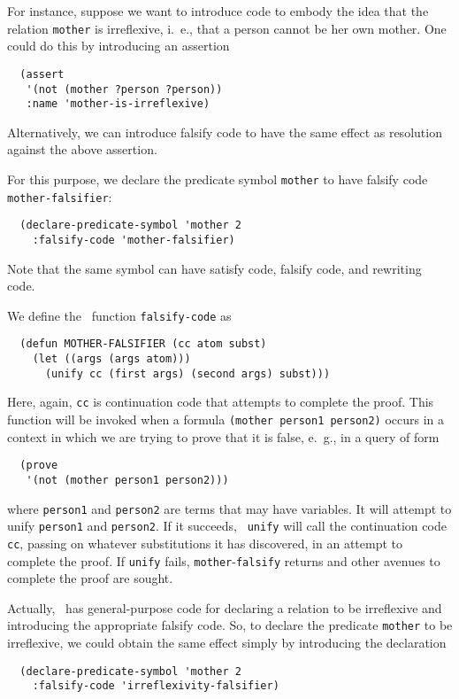 For instance, suppose we want to introduce code to embody the idea that the
relation {\tt mother} is irreflexive, i.\  e., that a person cannot be her own
mother.  One could do this by introducing an assertion
\begin{verbatim}
  (assert
   '(not (mother ?person ?person))
   :name 'mother-is-irreflexive)
\end{verbatim}
Alternatively, we can introduce falsify code to have the same effect as
resolution against the above assertion.

For this purpose, we declare the predicate symbol {\tt mother} to have
falsify code {\tt mother-falsifier}:
\begin{verbatim}
  (declare-predicate-symbol 'mother 2
    :falsify-code 'mother-falsifier)
\end{verbatim}
Note that the same symbol can have satisfy code, falsify code, and rewriting
code.

We define the \lisp\  function {\tt falsify-code} as
\begin{verbatim}
  (defun MOTHER-FALSIFIER (cc atom subst)
    (let ((args (args atom)))
      (unify cc (first args) (second args) subst)))
\end{verbatim}
Here, again, {\tt cc} is continuation code that attempts to complete the
proof.
This function will be invoked when a formula {\tt (mother person1 person2)}
occurs in a context in which we are trying to prove that it is false, e.\  g.,
in a query of form
\begin{verbatim}
  (prove
   '(not (mother person1 person2)))
\end{verbatim}
where {\tt person1} and {\tt person2} are terms that may have variables.  It
will attempt to unify {\tt person1} and {\tt person2}.  If it succeeds, {\tt
unify} will call the continuation code {\tt cc}, passing on whatever
substitutions it has discovered, in an attempt to complete the proof.  If
{\tt unify} fails, {\tt mother}-{\tt falsify} returns and other avenues to
complete the proof are sought.

Actually, \snark\  has general-purpose code for declaring a relation to be
irreflexive and introducing the appropriate falsify code.  So, to declare
the predicate {\tt mother} to be irreflexive, we could obtain the same effect
simply by introducing the declaration
\begin{verbatim}
  (declare-predicate-symbol 'mother 2
    :falsify-code 'irreflexivity-falsifier)
\end{verbatim}


